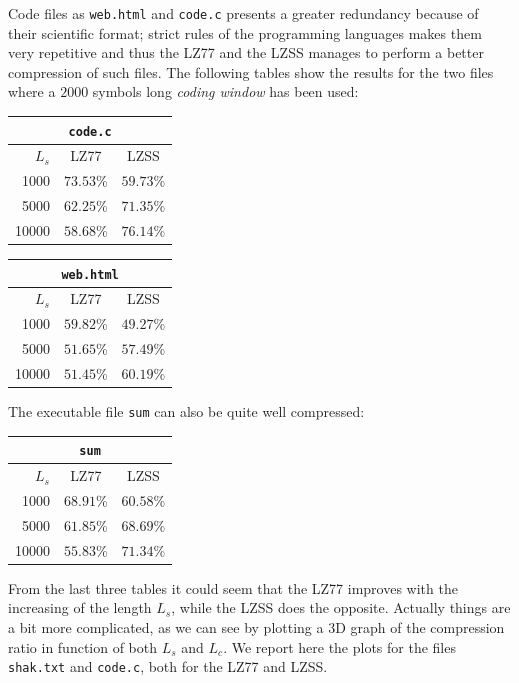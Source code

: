 Code files as \texttt{web.html} and \texttt{code.c} presents a greater redundancy because of their scientific format; strict rules of the programming languages makes them very repetitive and thus the LZ77 and the LZSS manages to perform a better compression of such files. The following tables show the results for the two files where a $2000$ symbols long \textit{coding window} has been used:
\begin{center}
\begin{tabular}{r | c | c |}
\multicolumn{3}{c|}{\texttt{code.c}} \\
\hline
$L_s$ & LZ77 & LZSS \\ \hline
1000 & $73.53$\% & $59.73$\% \\
5000& $62.25$\% & $71.35$\% \\
10000& $58.68$\% & $76.14$\% \\
\hline
\end{tabular}

\vspace{0.5cm}

\begin{tabular}{r | c | c |}
\multicolumn{3}{c|}{\texttt{web.html}} \\
\hline
$L_s$ & LZ77 & LZSS \\ \hline
1000 & $59.82$\% & $49.27$\% \\
5000& $51.65$\% & $57.49$\% \\
10000& $51.45$\% & $60.19$\% \\
\hline
\end{tabular}
\end{center}

The executable file \texttt{sum} can also be quite well compressed:
\begin{center}
\begin{tabular}{r | c | c |}
\multicolumn{3}{c|}{\texttt{sum}} \\ 
\hline
$L_s$ & LZ77 & LZSS \\ \hline
1000 & $68.91$\% & $60.58$\% \\
5000& $61.85$\% & $68.69$\% \\
10000& $55.83$\% & $71.34$\% \\
\hline
\end{tabular}
\end{center}

From the last three tables it could seem that the LZ77 improves with the increasing of the length $L_s$, while the LZSS does the opposite. Actually things are a bit more complicated, as we can see by plotting a 3D graph of the compression ratio in function of both $L_s$ and $L_c$. We report here the plots for the files \texttt{shak.txt} and \texttt{code.c}, both for the LZ77 and LZSS. 

